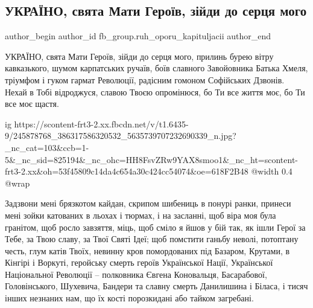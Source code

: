  
 
 
 
 
 
\subsection{УКРАЇНО, свята Мати Героїв, зійди до серця мого}
\label{sec:14_10_2021.fb.fb_group.ruh_oporu_kapituljacii.1.ukraina_svjata_maty_geroiv}
 
\ifcmt
 author_begin
   author_id fb_group.ruh_oporu_kapituljacii
 author_end
\fi

УКРАЇНО, свята Мати Героїв, зійди до серця мого, прилинь бурею вітру
кавказького, шумом карпатських ручаїв, боїв славного Завойовника Батька Хмеля,
тріумфом і гуком гармат Революції, радісним гомоном Софійських Дзвонів. Нехай в
Тобі відроджуся, славою Твоєю опромінюся, бо Ти все життя моє, бо Ти все моє
щастя. 

\ifcmt
  ig https://scontent-frt3-2.xx.fbcdn.net/v/t1.6435-9/245878768_386317586320532_5635739707232690339_n.jpg?_nc_cat=103&ccb=1-5&_nc_sid=825194&_nc_ohc=HH8FsvZRw9YAX8smoo1&_nc_ht=scontent-frt3-2.xx&oh=53f45809c14da4c654a30c424cc54074&oe=618F2B48
  @width 0.4
  @wrap 
\fi

Задзвони мені брязкотом кайдан, скрипом шибениць в понурі ранки, принеси мені
зойки катованих в льохах і тюрмах, і на засланні, щоб віра моя була гранітом,
щоб росло завзяття, міць, щоб сміло я йшов у бій так, як ішли Герої за Тебе, за
Твою славу, за Твої Святі Ідеї; щоб помстити ганьбу неволі, потоптану честь,
глум катів Твоїх, невинну кров помордованих під Базаром, Крутами, в Кінгірі і
Воркуті, геройську смерть героїв Української Нації, Української Національної
Революції – полковника Євгена Коновальця, Басарабової, Головінського, Шухевича,
Бандери та славну смерть Данилишина і Біласа, і тисяч інших незнаних нам, що їх
кості порозкидані або тайком загребані.

